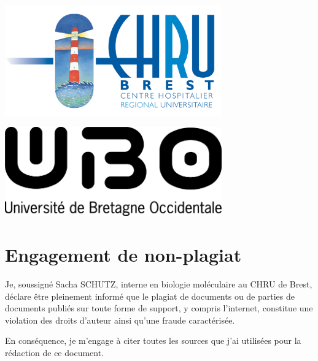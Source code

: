 \documentclass[12pt,a4paper]{article}
\begin{document}
\begin{titlepage}
\begin{minipage}[c]{0.3\textwidth}
   \includegraphics[width=0.7\textwidth]{img/logo_brest.jpg}\hfill
\end{minipage}
\begin{minipage}[c]{0.3\textwidth}
   \includegraphics[width=0.7\textwidth]{img/ubo.png}
\end{minipage}
%



\vfill %

\end{titlepage}



\newpage

\section*{Engagement de non-plagiat}

Je, soussigné Sacha SCHUTZ, interne en biologie moléculaire au CHRU de Brest, déclare être pleinement informé que le plagiat de
documents ou de parties de documents publiés sur toute forme de
support, y compris l'internet, constitue une violation des droits
d'auteur ainsi qu'une fraude caractérisée.

En conséquence, je m'engage à citer toutes les sources que j'ai
utilisées pour la rédaction de ce document.
\end{document}
